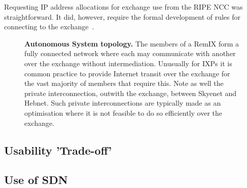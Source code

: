 Requesting IP address allocations for exchange use from the RIPE NCC
was straightforward. It did, however, require the formal development
of rules for connecting to the exchange~\cite{whixrules}.


\begin{figure}[h]
  \resizebox{\linewidth}{!}{
    \begin{tikzpicture}
      \whixtopodiagram
    \end{tikzpicture}
  }
  \caption{
  \textbf{Autonomous System topology.} The members of a RemIX form a fully connected network where each may communicate
  with another over the exchange without intermediation. Unusually for \acp{IXP} it is common practice to provide Internet transit over the exchange for the vast majority of members that require this. Note as
  well the private interconnection, outwith the exchange, between Skyenet
  and Hebnet. Such private interconnections are typically made as
  an optimisation where it is not feasible to do so efficiently over the exchange.
  }
\end{figure}



\subsection{Usability 'Trade-off'} \label{subsec:use}


\subsection{Use of SDN}
